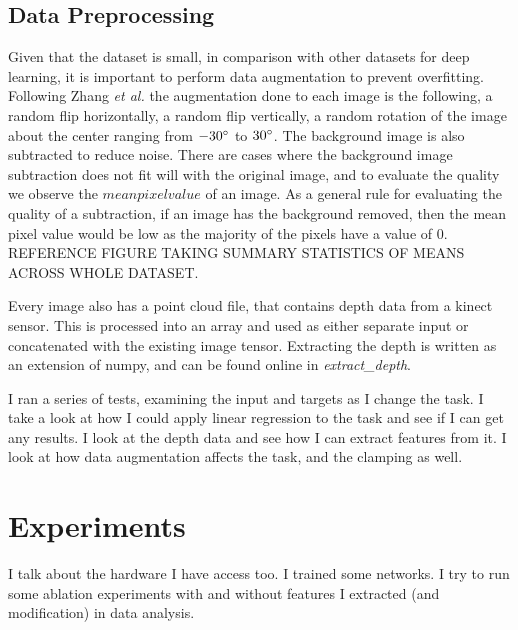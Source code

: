 \documentclass{article}
\begin{document}
\subsection{Data Preprocessing}
Given that the dataset is small, in comparison with other datasets for deep
learning, it is important to perform data augmentation to prevent overfitting.
Following Zhang \textit{et al.} \cite{zhang18} the augmentation done to each
image is the following, a random flip horizontally, a random flip vertically,
a random rotation of the image about the center ranging from $-30\degree$ to
$30\degree$. The background image is also subtracted to reduce noise.
There are cases where the background image subtraction does not fit will with the
original image, and to evaluate the quality we observe the $mean pixel value$ of an
image. As a general rule for evaluating the quality of a subtraction, if an image
has the background removed, then the mean pixel value would be low as the
majority of the pixels have a value of $0$. REFERENCE FIGURE TAKING SUMMARY STATISTICS
OF MEANS ACROSS WHOLE DATASET.

Every image also has a point cloud file, that contains depth data from a kinect
sensor. This is processed into an array and used as either separate input or
concatenated with the existing image tensor. Extracting the depth is written as an
extension of numpy, and can be found online in \textit{extract\_depth}.

I ran a series of tests, examining the input and targets as I change the task.
I take a look at how I could apply linear regression to the task and see if
I can get any results. I look at the depth data and see how I can extract
features from it. I look at how data augmentation affects the task, and the
clamping as well.

\section{Experiments}
I talk about the hardware I have access too. I trained some networks. I try
to run some ablation experiments with and without features I extracted (and
modification) in data analysis.



\end{document}
